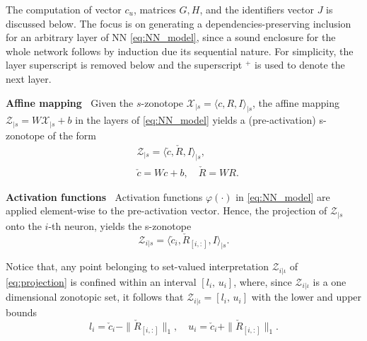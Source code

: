 \documentclass[journal]{IEEEtran}
\begin{document}
The computation of vector $c_u$, matrices $G,H$, and the identifiers vector $J$ is discussed below. The focus is on generating a dependencies-preserving inclusion for an arbitrary layer of NN \eqref{eq:NN_model}, since a sound enclosure for the whole network follows by induction due its sequential nature. For simplicity, the layer superscript is removed below and the superscript $^+$ is used to denote the next layer.

\textbf{Affine mapping} $ \ $ Given the  $s$-zonotope $\mathcal{X}_{|s} = \langle c, R, I \rangle_{|s}$, the affine mapping $\mathcal{Z}_{|s} = W\mathcal{X}_{|s} + b$ in the layers of \eqref{eq:NN_model} yields a (pre-activation) s-zonotope of the form
\begin{equation}
\begin{aligned}
    &\mathcal{Z}_{|s} = \langle \check{c}, \check{R},I \rangle_{|s},\\
    & \check{c} = Wc+b,    \quad \check{R} = WR.
\end{aligned}
\end{equation}

\textbf{Activation functions} $ \ $ Activation functions  $\varphi(\cdot)$ in \eqref{eq:NN_model}  are applied element-wise to the pre-activation vector. Hence, the projection of $\mathcal{Z}_{|s}$ onto  the $i$-th neuron, yields the s-zonotope
\begin{equation}\label{eq:projection}
    \mathcal{Z}_{i|s} = \langle \check{c}_i,\check{R}_{[i,:]},I \rangle_{|s}.
\end{equation}

Notice that, any point belonging to set-valued interpretation $\mathcal{Z}_{i|\iota}$ of \eqref{eq:projection} is confined within an interval $[l_i, \, u_i]$, where, since $\mathcal{Z}_{i|\iota}$ is a one dimensional zonotopic set, it follows that $\mathcal{Z}_{i|\iota} = [l_i, \, u_i]$ with the  lower and upper bounds
\begin{equation} \label{eq:bounds}
    l_i = \check{c}_i - \|\check{R}_{[i,:]}\|_1, \quad u_i = \check{c}_i + \|\check{R}_{[i,:]}\|_1.
\end{equation}
\end{document}
